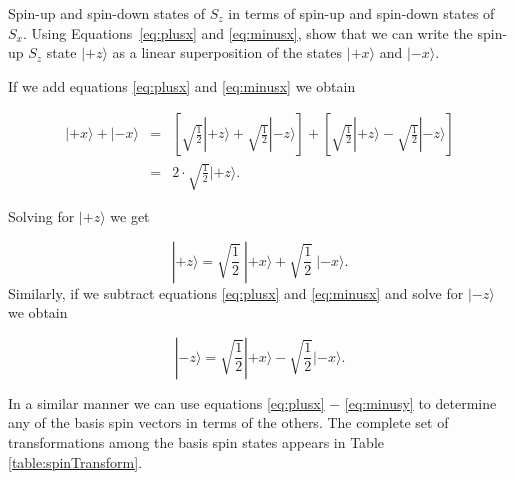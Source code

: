 \begin{example}{Spin-up and spin-down states of $S_z$ in terms of spin-up and spin-down states of $S_x$.}
\label{exam:ztox}
Using Equations~\ref{eq:plusx} and \ref{eq:minusx}, show that we can write the spin-up $S_z$ state $|\mbox{$+z$}\rangle$ as a linear superposition of the states $|\mbox{$+x$}\rangle$ and $|\mbox{$-x$}\rangle$.

\solution If we add equations \ref{eq:plusx} and \ref{eq:minusx} we obtain

\begin{eqnarray}
|\mbox{$+x$}\rangle + |\mbox{$-x$}\rangle & = & \left[ \sqrt{\frac{1}{2}}|\mbox{$+z$}\rangle + \sqrt{\frac{1}{2}}|\mbox{$-z$}\rangle \right] + \left[ \sqrt{\frac{1}{2}}|\mbox{$+z$}\rangle - \sqrt{\frac{1}{2}}|\mbox{$-z$}\rangle \right] \nonumber\\
 & = & 2 \cdot \sqrt{\frac{1}{2}} |\mbox{$+z$}\rangle .\nonumber
\end{eqnarray}

\noindent Solving for $|\mbox{$+z$}\rangle$ we get

\begin{equation}
|\mbox{$+z$}\rangle = \sqrt{\frac{1}{2}}\ |\mbox{$+x$}\rangle + \sqrt{\frac{1}{2}}\ |\mbox{$-x$}\rangle .\nonumber
\end{equation}
Similarly, if we subtract equations \ref{eq:plusx} and \ref{eq:minusx} and solve for $|\mbox{$-z$}\rangle$ we obtain

\begin{equation}
|\mbox{$-z$}\rangle = \sqrt{\frac{1}{2}} |\mbox{$+x$}\rangle - \sqrt{\frac{1}{2}} |\mbox{$-x$}\rangle .\nonumber
\end{equation}

In a similar manner we can use equations \ref{eq:plusx} $-$
\ref{eq:minusy} to determine any of the basis spin vectors in terms of
the others.  The complete set of transformations among the basis spin
states appears in Table \ref{table:spinTransform}.

\end{example}


